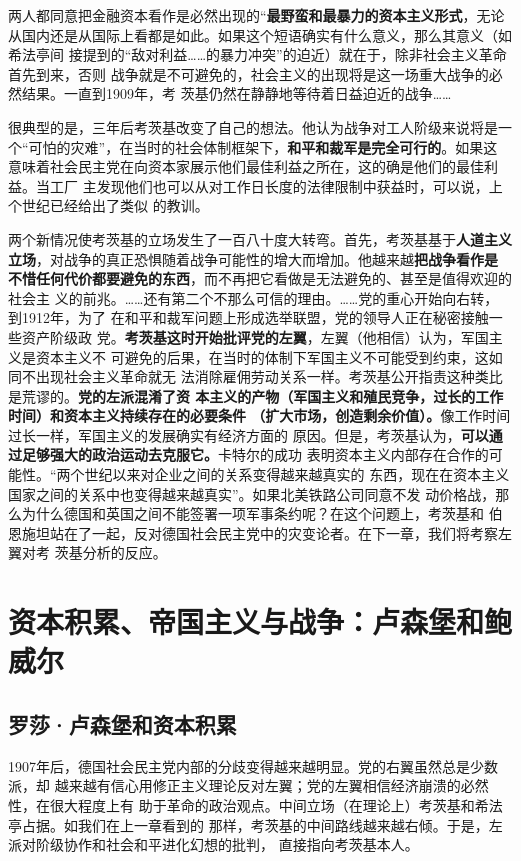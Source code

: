 两人都同意把金融资本看作是必然出现的“\textbf{最野蛮和最暴力的资本主义形式}，无论
从国内还是从国际上看都是如此。如果这个短语确实有什么意义，那么其意义（如希法亭间
接提到的“敌对利益……的暴力冲突”的迫近）就在于，除非社会主义革命首先到来，否则
战争就是不可避免的，社会主义的出现将是这一场重大战争的必然结果。一直到1909年，考
茨基仍然在静静地等待着日益迫近的战争……

很典型的是，三年后考茨基改变了自己的想法。他认为战争对工人阶级来说将是一
个“可怕的灾难”，在当时的社会体制框架下，\textbf{和平和裁军是完全可行的}。如果这
意味着社会民主党在向资本家展示他们最佳利益之所在，这的确是他们的最佳利益。当工厂
主发现他们也可以从对工作日长度的法律限制中获益时，可以说，上个世纪已经给出了类似
的教训。

两个新情况使考茨基的立场发生了一百八十度大转弯。首先，考茨基基于\textbf{人道主义
  立场}，对战争的真正恐惧随着战争可能性的增大而增加。他越来越\textbf{把战争看作是
  不惜任何代价都要避免的东西}，而不再把它看做是无法避免的、甚至是值得欢迎的社会主
义的前兆。……还有第二个不那么可信的理由。……党的重心开始向右转，到1912年，为了
在和平和裁军问题上形成选举联盟，党的领导人正在秘密接触一些资产阶级政
党。\textbf{考茨基这时开始批评党的左翼}，左翼（他相信）认为，军国主义是资本主义不
可避免的后果，在当时的体制下军国主义不可能受到约束，这如同不出现社会主义革命就无
法消除雇佣劳动关系一样。考茨基公开指责这种类比是荒谬的。\textbf{党的左派混淆了资
  本主义的产物（军国主义和殖民竞争，过长的工作时间）和资本主义持续存在的必要条件
  （扩大市场，创造剩余价值）。}像工作时间过长一样，军国主义的发展确实有经济方面的
原因。但是，考茨基认为，\textbf{可以通过足够强大的政治运动去克服它。}卡特尔的成功
表明资本主义内部存在合作的可能性。“两个世纪以来对企业之间的关系变得越来越真实的
东西，现在在资本主义国家之间的关系中也变得越来越真实”。如果北美铁路公司同意不发
动价格战，那么为什么德国和英国之间不能签署一项军事条约呢？在这个问题上，考茨基和
伯恩施坦站在了一起，反对德国社会民主党中的灾变论者。在下一章，我们将考察左翼对考
茨基分析的反应。

\chapter{资本积累、帝国主义与战争：卢森堡和鲍威尔}

\section{罗莎·卢森堡和资本积累}
1907年后，德国社会民主党内部的分歧变得越来越明显。党的右翼虽然总是少数派，却
越来越有信心用修正主义理论反对左翼；党的左翼相信经济崩溃的必然性，在很大程度上有
助于革命的政治观点。中间立场（在理论上）考茨基和希法亭占据。如我们在上一章看到的
那样，考茨基的中间路线越来越右倾。于是，左派对阶级协作和社会和平进化幻想的批判，
直接指向考茨基本人。

